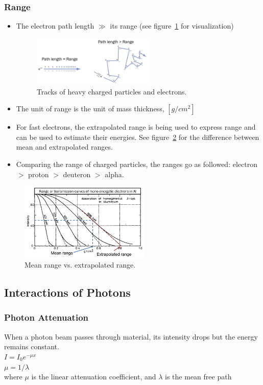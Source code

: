 \subsubsection{Range}
\begin{itemize}
    \item The electron path length $\gg$ its range (see figure~\ref{fig:range_vs_pathlength} for visualization)
    \begin{figure}[ht]
        \centering
        \includegraphics[width=0.55\textwidth]{images/range_vs_pathlength.png}
        \caption{Tracks of heavy charged particles and electrons.}
        \label{fig:range_vs_pathlength}
    \end{figure}
    \item The unit of range is the unit of mass thickness, $[g/cm^2]$
    \item For fast electrons, the extrapolated range is being used to express range and can be used to estimate their energies. See figure~\ref{fig:electron_range} for the difference between mean and extrapolated ranges.
    \item Comparing the range of charged particles, the ranges go as followed: electron $>$ proton $>$ deuteron $>$ alpha.
\end{itemize}
\begin{figure}[ht]
    \centering
    \includegraphics[width=0.55\textwidth]{images/electron_range.png}
    \caption{Mean range vs. extrapolated range.}
    \label{fig:electron_range}
\end{figure}
\subsection{Interactions of Photons}
\subsubsection{Photon Attenuation}
When a photon beam passes through material, its intensity drops but the energy remains constant.\\
$I=I_0e^{-\mu x}$\\
$\mu=1/\lambda$\\
where $\mu$ is the linear attenuation coefficient, and $\lambda$ is the mean free path
